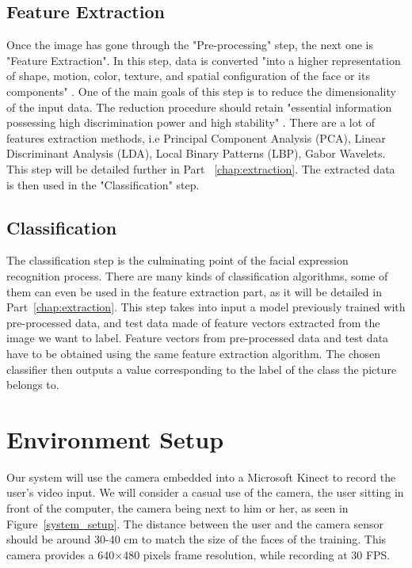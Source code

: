 \subsection{Feature Extraction}

\vspace{\baselineskip}
\noindent Once the image has gone through the "Pre-processing" step, the next one is "Feature Extraction". In this step, data is converted "into a higher representation of shape, motion, color, texture, and spatial configuration of the face or its components" \cite{CHI03}. One of the main goals of this step is to reduce the dimensionality of the input data. The reduction procedure should retain "essential information possessing high discrimination power and high stability" \cite{CHI03}. There are a lot of features extraction methods, i.e Principal Component Analysis (PCA), Linear Discriminant Analysis (LDA), Local Binary Patterns (LBP), Gabor Wavelets. This step will be detailed further in Part ~\ref{chap:extraction}. The extracted data is then used in the "Classification" step.
\newline

\subsection{Classification}

\noindent The classification step is the culminating point of the facial expression recognition process. There are many kinds of classification algorithms, some of them can even be used in the feature extraction part, as it will be detailed in Part~\ref{chap:extraction}. This step takes into input a model previously trained with pre-processed data, and test data made of feature vectors extracted from the image we want to label. Feature vectors from pre-processed data and test data have to be obtained using the same feature extraction algorithm. The chosen classifier then outputs a value corresponding to the label of the class the picture belongs to.

\section{Environment Setup}

\vspace{\baselineskip}
\noindent Our system will use the camera embedded into a Microsoft Kinect to record the user's video input. We will consider a casual use of the camera, the user sitting in front of the computer, the camera being next to him or her, as seen in Figure~\ref{system_setup}. The distance between the user and the camera sensor should be around 30-40 cm to match the size of the faces of the training. This camera provides a 640$\times$480 pixels frame resolution, while recording at 30 FPS.
\newline

